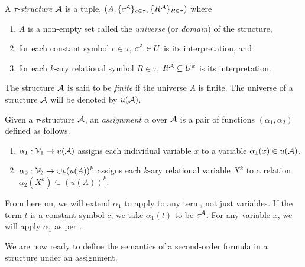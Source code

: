 \documentclass[11pt,twoside=off,numbers=noenddot]{scrbook}
\begin{document}
\begin{definition}
  A \emph{$\tau$-structure} $\mathcal{A}$ is a tuple, $(A,
  \{ c^{\mathcal{A}} \}_{c \in \tau}, \{ R^{\mathcal{A}} \}_{R \in \tau})$ where
  \begin{enumerate}
    \item $A$ is a non-empty set called the \emph{universe} (or
      \emph{domain}) of the structure,
    \item for each constant symbol $c \in \tau$, $c^{\mathcal{A}} \in U$ is
      its interpretation, and
    \item for each $k$-ary relational symbol $R \in \tau$, $R^{\mathcal{A}}
      \subseteq U^k$ is its interpretation.
  \end{enumerate}
\end{definition}

The structure $\mathcal{A}$ is said to be \emph{finite} if the universe
$A$ is finite. The universe of a structure $\mathcal{A}$ will be denoted
by $u(\mathcal{A})$.

\begin{definition}
  Given a $\tau$-structure $\mathcal{A}$, an \emph{assignment} $\alpha$
  over $\mathcal{A}$ is a pair of functions $(\alpha_1, \alpha_2)$
  defined as follows.
  \begin{enumerate}
    \item $\alpha_1 : \mathcal{V}_1 \to u(\mathcal{A})$ assigns each individual
      variable $x$ to a variable $\alpha_1(x) \in u(\mathcal{A})$.
    \item $\alpha_2 : \mathcal{V}_2 \to \cup_k (u(A))^k$ assigns each
      $k$-ary relational variable $X^k$ to a relation $\alpha_2(X^k)
      \subseteq (u(A))^k$.
  \end{enumerate}
\end{definition}

\begin{abuse}
  From here on, we will extend $\alpha_1$ to apply to any term, not
  just variables. If the term $t$ is a constant symbol $c$, we take
  $\alpha_1(t)$ to be $c^{\mathcal{A}}$. For any variable $x$, we will
  apply $\alpha_1$ as per .
\end{abuse}

We are now ready to define the semantics of a second-order formula in
a structure under an assignment.
\end{document}
